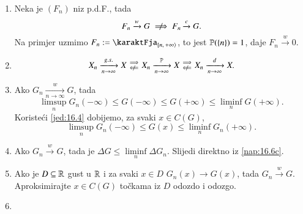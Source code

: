 \begin{nap} \label{nap:16.6}
    \begin{enumerate}[label=(\alph*)]
        \item Neka je $(F_n)$ niz p.d.F., tada
        \begin{equation*}
            F_n \xrightarrow{w} G \centernot\implies F_n \xrightarrow{c} G.
        \end{equation*}
        Na primjer uzmimo $F_n := \karaktFja_{\desInt{n}{+\infty}}$, to jest $\mathbb{P}(\{n\}) = 1$, daje $F_n \xrightarrow{w} 0$.
        \item
        \begin{equation*}
            X_n \xrightarrow[n \to \infty]{g.s.} X
            \begin{smallmatrix}
                \implies\\
                \notimpliedby
            \end{smallmatrix}
            X_n \xrightarrow[n \to \infty]{\masP} X
            \begin{smallmatrix}
                \implies\\
                \notimpliedby
            \end{smallmatrix}
            X_n \xrightarrow[n \to \infty]{d} X.
        \end{equation*}
        \item   \label{nap:16.6c}
        Ako $G_n \xrightarrow[n \to \infty]{w} G$, tada
            \begin{equation*}
                \limsup\limits_n G_n(-\infty) \leq G(-\infty) \leq G(+ \infty) \leq \liminf\limits_n G(+\infty).
            \end{equation*}
            Koriste\' ci \eqref{jed:16.4} dobijemo, za svaki $x \in C(G)$,
            \begin{equation*}
                \limsup\limits_n G_n (-\infty) \leq G(x) \leq \liminf\limits_n G_n (+\infty).
            \end{equation*}
        \item   \label{nap:16.6d}
        Ako $G_n \xrightarrow{w} G$, tada je $\Delta G \leq \liminf\limits_n \Delta G_n$.
        Slijedi direktno iz \ref{nap:16.6c}.
        \item   \label{nap:16.6e}
        Ako je $D \subseteq \mathbb{R}$ gust u $\mathbb{R}$ i za svaki $x \in D$ $G_n (x) \xrightarrow{} G (x)$, tada $G_n \xrightarrow{w} G$.
        Aproksimirajte $x \in C(G)$ to\v ckama iz $D$ odozdo i odozgo.
        \item   \label{nap:16.6f}

\end{enumerate}
\end{nap}
